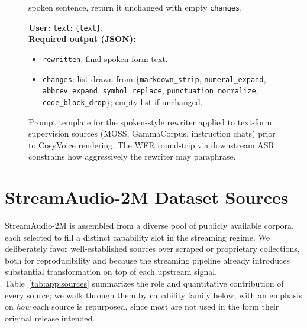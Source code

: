 \documentclass{llmxive}
\begin{document}
\begin{figure}[!htbp]
\begin{tcolorbox}
\begin{itemize}
        spoken sentence, return it unchanged with empty
        \texttt{changes}.
\end{itemize}
\textbf{User:} \texttt{text}: \verb|{text}|.\\[2pt]
\textbf{Required output (JSON):}
\begin{itemize}\setlength\itemsep{0pt}\setlength\topsep{0pt}
  \item \texttt{rewritten}: final spoken-form text.
  \item \texttt{changes}: list drawn from \{\texttt{markdown\_strip},
        \texttt{numeral\_expand}, \texttt{abbrev\_expand},
        \texttt{symbol\_replace}, \texttt{punctuation\_normalize},
        \texttt{code\_block\_drop}\}; empty list if unchanged.
\end{itemize}
\end{tcolorbox}
\caption{Prompt template for the spoken-style rewriter applied to
text-form supervision sources (MOSS, GammaCorpus, instruction chats)
prior to CosyVoice rendering. The WER round-trip via downstream ASR
constrains how aggressively the rewriter may paraphrase.}
\label{prompt:tts}
\end{figure}


\section{StreamAudio-2M Dataset Sources}
\label{app:dataset}

StreamAudio-2M is assembled from a diverse pool of publicly available corpora, each
selected to fill a distinct capability slot in the streaming regime. We deliberately favor
well-established sources over scraped or proprietary collections, both for reproducibility
and because the streaming pipeline already introduces substantial transformation on top of
each upstream signal. Table~\ref{tab:app:sources} summarizes the role and quantitative
contribution of every source; we walk through them by capability family below, with an
emphasis on \emph{how} each source is repurposed, since most are not used in the form their
original release intended.
\end{document}
